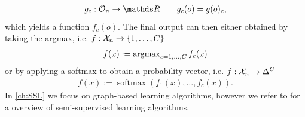 %
\begin{align*}
g_c:\conset_n\to\R\qquad g_c(o) = g(o)_c,
\end{align*}
%
which yields a function $f_c(o)$. The final output can then either obtained by taking the argmax, i.e. $f:\mathcal{X}_n\to\{1,\ldots, C\}$ 
%
\begin{align*}
f(x) := \operatorname{argmax}_{c=1,\ldots, C} f_c(x)
\end{align*}
%
or by applying a softmax to obtain a probability vector, i.e. $f:\mathcal{X}_n\to\Delta^C$ 
%
\begin{align*}
f(x) := \operatorname{soft max}\left(f_1(x), \ldots, f_c(x)\right).
\end{align*}
%
In \cref{ch:SSL} we focus on graph-based learning algorithms, however we refer to \cite{zhu2005semi} for a overview of semi-supervised learning algorithms. 
